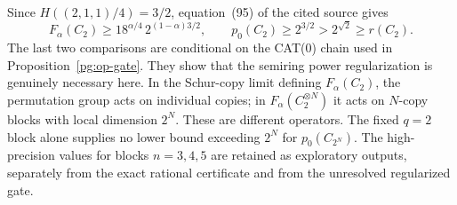 Since $H((2,1,1)/4)=3/2$, equation~(95) of the cited source gives
\[
 F_\alpha(C_2)\geq
 18^{\alpha/4}\,2^{(1-\alpha)3/2},
 \qquad p_0(C_2)\geq2^{3/2}>2^{\sqrt2}\geq r(C_2).
 \tag{PG-OP-strict-drop}
\]
The last two comparisons are conditional on the CAT(0) chain used
in Proposition~\ref{pg:op-gate}. They show that the semiring power
regularization is genuinely necessary here. In the Schur-copy limit
defining $F_\alpha(C_2)$, the permutation group acts on individual
copies; in $F_\alpha(C_2^{\otimes N})$ it acts on $N$-copy blocks
with local dimension $2^N$. These are different operators.
The fixed $q=2$ block alone supplies no lower bound exceeding $2^N$
for $p_0(C_{2^N})$. The high-precision values for blocks $n=3,4,5$
are retained as exploratory outputs, separately from the exact
rational certificate and from the unresolved regularized gate.

